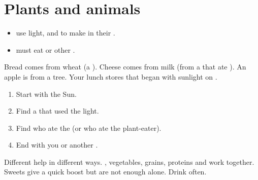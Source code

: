 \section{Plants and animals}

\begin{proposition}\label{prop:g2:food-energy:two}
\begin{itemize}
  \item {} use light,  and  to make  in their
        .
  \item {} must eat  or other .
\end{itemize}
\end{proposition}
\admitted

\begin{example}\label{ex:g2:food-energy:lunch}
Bread comes from wheat (a ). Cheese comes from milk (from a
 that ate ). An apple is from a tree. Your lunch stores
 that began with sunlight on .
\end{example}

\begin{method}\label{met:g2:food-energy:trace}
\begin{enumerate}
  \item Start with the Sun.
  \item Find a  that used the light.
  \item Find who ate the  (or who ate the plant-eater).
  \item End with you or another .
\end{enumerate}
\end{method}

\begin{definition}\label{def:g2:food-energy:healthy}
Different  help in different ways. , vegetables, grains,
proteins and  work together. Sweets give a quick boost but are
not enough alone. Drink  often.
\end{definition}

